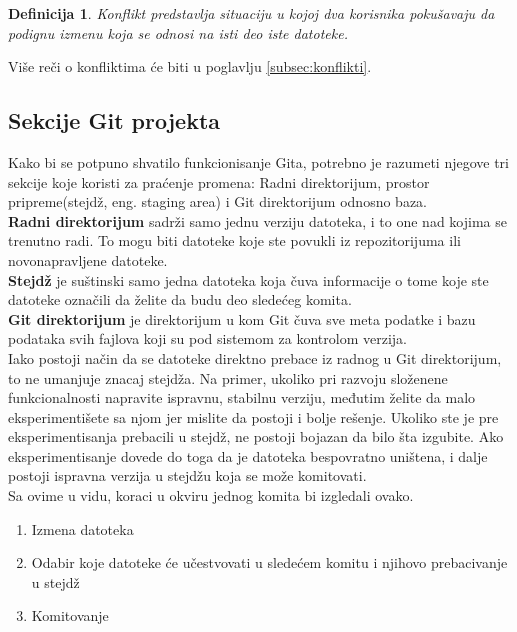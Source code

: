 \documentclass[a4paper]{article}
\newtheorem{definicija}{Definicija}[section]
\begin{document}
{\begin{definicija}
Konflikt predstavlja situaciju u kojoj dva korisnika pokušavaju da podignu izmenu koja se odnosi na isti deo iste datoteke.
\end{definicija}
Više reči o konfliktima će biti u poglavlju \ref{subsec:konflikti}.


\subsection{Sekcije Git projekta}
\label{subsec:sekcije}
Kako bi se potpuno shvatilo funkcionisanje Gita, potrebno je razumeti njegove tri sekcije koje koristi za praćenje promena: Radni direktorijum, prostor pripreme(stejdž, eng. staging area) i Git direktorijum odnosno baza.\\

\textbf{Radni direktorijum} sadrži samo jednu verziju datoteka, i to one nad kojima se trenutno radi. To mogu biti datoteke koje ste povukli iz repozitorijuma ili novonapravljene datoteke.\\

\textbf{Stejdž} je suštinski samo jedna datoteka koja čuva informacije o tome koje ste datoteke označili da želite da budu deo sledećeg komita.\\

\textbf{Git direktorijum} je direktorijum u kom Git čuva sve meta podatke i bazu podataka svih fajlova koji su pod sistemom za kontrolom verzija.\\

Iako postoji način da se datoteke direktno prebace iz radnog u Git direktorijum, to ne umanjuje znacaj stejdža. Na primer, ukoliko pri razvoju složenene funkcionalnosti napravite ispravnu, stabilnu verziju, međutim želite da malo eksperimentišete sa njom jer mislite da postoji i bolje rešenje. Ukoliko ste je pre eksperimentisanja prebacili u stejdž, ne postoji bojazan da bilo šta izgubite. Ako eksperimentisanje dovede do toga da je datoteka bespovratno uništena, i dalje postoji ispravna verzija u stejdžu koja se može komitovati.\\

Sa ovime u vidu, koraci u okviru jednog komita bi izgledali ovako.
\begin{enumerate}
\item Izmena datoteka
\item Odabir koje datoteke će učestvovati u sledećem komitu i njihovo prebacivanje u stejdž
\item Komitovanje
\end{enumerate}

}
\end{document}
